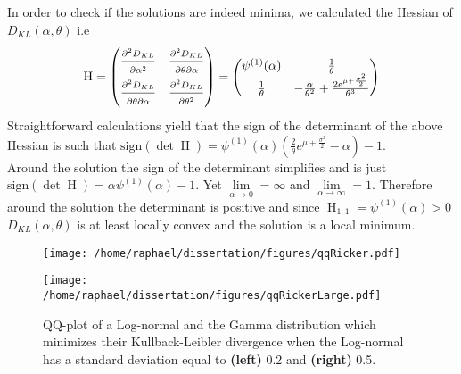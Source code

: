 \documentclass[12pt]{article}
\begin{document}
\begin{appendices}
	In order to check if the solutions are indeed minima, we calculated the Hessian of $D_{KL}(\alpha, \theta)$ i.e
	\begin{equation*}
	\text{H} = \begin{pmatrix}
	\frac{\strut \partial^2 D_{KL}}{\strut \partial \alpha^2} & \frac{\strut \partial^2 D_{KL}}{\strut \partial \theta \partial \alpha} \\
	\frac{\strut \partial^2 D_{KL}}{\strut \partial \theta \partial \alpha} & \frac{\strut \partial^2 D_{KL}}{\strut \partial \theta^2} 
	\end{pmatrix} =
	\begin{pmatrix}
	\psi^{(1)}(\alpha) & \frac{1}{\theta} \\
	\frac{1}{\theta} & -\frac{\alpha}{\theta^2}+\frac{2e^{\mu +\frac{\sigma^2}{2}}}{\theta^3}
	\end{pmatrix}
	\end{equation*}
	Straightforward calculations yield that the sign of the determinant of the above Hessian is such that $\text{sign}(\det{\operatorname{H}}) = \psi^{(1)}(\alpha)(\frac{2}{\theta}e^{\mu +\frac{\sigma^2}{2}} - \alpha) - 1$. \\
	Around the solution the sign of the determinant simplifies and is just $\text{sign}(\det{\operatorname{H}}) = \alpha\psi^{(1)}(\alpha) - 1$. Yet $\lim\limits_{\alpha \rightarrow 0} = \infty$ and $\lim\limits_{\alpha \rightarrow \infty} = 1$. Therefore around the solution the determinant is positive and since $\operatorname{H}_{1,1} = \psi^{(1)}(\alpha) > 0$ $D_{KL}(\alpha, \theta)$ is at least locally convex and the solution is a local minimum.
	\begin{figure}[htb]
		\vspace{5mm}
		\centering
		\begin{minipage}{0.49\textwidth}
			\centering
			\texttt{[image: /home/raphael/dissertation/figures/qqRicker.pdf]}
		\end{minipage}
		\begin{minipage}{0.49\textwidth}
			\centering
			\texttt{[image: /home/raphael/dissertation/figures/qqRickerLarge.pdf]}
		\end{minipage}
		\caption[Comparison between a Log-normal and the Gamma distribution which minimizes their Kullback-Leibler divergence]{QQ-plot of a Log-normal and the Gamma distribution which minimizes their Kullback-Leibler divergence when the Log-normal has a standard deviation equal to \textbf{(left)} 0.2 and \textbf{(right)} 0.5.}
		\label{fig:quality}
		\vspace{5mm}
	\end{figure}
	

\end{appendices}
\end{document}
